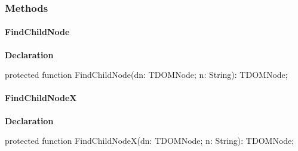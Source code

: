 \documentclass{report}
\newif\ifpdf
\begin{document}
\subsubsection*{\large{\textbf{Methods}}\normalsize\hspace{1ex}\hfill}
\paragraph*{FindChildNode}\hspace*{\fill}

\label{ipkhandle.TInstallation-FindChildNode}
\begin{list}{}{
\setlength{\itemindent}{0cm}
\setlength{\listparindent}{0cm}
\setlength{\leftmargin}{\evensidemargin}
\addtolength{\leftmargin}{\tmplength}
\settowidth{\labelsep}{X}
\addtolength{\leftmargin}{\labelsep}
\setlength{\labelwidth}{\tmplength}
}
\item[\textbf{Declaration}\hfill]
\ifpdf
\begin{flushleft}
\fi
\begin{ttfamily}
protected function FindChildNode(dn: TDOMNode; n: String): TDOMNode;\end{ttfamily}

\ifpdf
\end{flushleft}
\fi

\end{list}
\paragraph*{FindChildNodeX}\hspace*{\fill}

\label{ipkhandle.TInstallation-FindChildNodeX}
\begin{list}{}{
\setlength{\itemindent}{0cm}
\setlength{\listparindent}{0cm}
\setlength{\leftmargin}{\evensidemargin}
\addtolength{\leftmargin}{\tmplength}
\settowidth{\labelsep}{X}
\addtolength{\leftmargin}{\labelsep}
\setlength{\labelwidth}{\tmplength}
}
\item[\textbf{Declaration}\hfill]
\ifpdf
\begin{flushleft}
\fi
\begin{ttfamily}
protected function FindChildNodeX(dn: TDOMNode; n: String): TDOMNode;\end{ttfamily}

\ifpdf
\end{flushleft}
\fi

\end{list}
\end{document}
